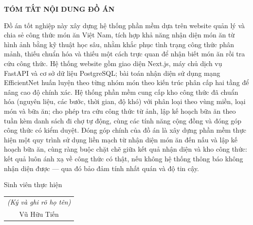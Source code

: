 \documentclass[../DoAn.tex]{subfiles}
\begin{document}
\begin{center}
    \Large{\textbf{TÓM TẮT NỘI DUNG ĐỒ ÁN}}\\
\end{center}
\vspace{1cm}
Đồ án tốt nghiệp này xây dựng hệ thống phần mềm dựa trên website quản lý và chia sẻ công thức món ăn Việt Nam, tích hợp khả năng nhận diện món ăn từ hình ảnh bằng kỹ thuật học sâu, nhằm khắc phục tình trạng công thức phân mảnh, thiếu chuẩn hóa và thiếu một cách trực quan để nhận biết món ăn rồi tra cứu công thức. Hệ thống website gồm giao diện Next.js, máy chủ dịch vụ FastAPI và cơ sở dữ liệu PostgreSQL; bài toán nhận diện sử dụng mạng EfficientNet huấn luyện theo từng nhóm món theo kiến trúc phân cấp hai tầng để nâng cao độ chính xác. Hệ thống phần mềm cung cấp kho công thức đã chuẩn hóa (nguyên liệu, các bước, thời gian, độ khó) với phân loại theo vùng miền, loại món và bữa ăn; cho phép tra cứu công thức từ ảnh, lập kế hoạch bữa ăn theo tuần kèm danh sách đi chợ tự động, cùng các tính năng cộng đồng và đóng góp công thức có kiểm duyệt. Đóng góp chính của đồ án là xây dựng phần mềm thực hiện một quy trình sử dụng liền mạch từ nhận diện món ăn đến nấu và lập kế hoạch bữa ăn, cùng ràng buộc chặt chẽ giữa kết quả nhận diện và kho công thức: kết quả luôn ánh xạ về công thức có thật, nếu không hệ thống thông báo không nhận diện được — qua đó bảo đảm tính nhất quán và độ tin cậy.
\begin{flushright}
Sinh viên thực hiện\\
\begin{tabular}{@{}c@{}}
\textit{(Ký và ghi rõ họ tên)}\\[1cm]
Vũ Hữu Tiến
\end{tabular}
\end{flushright}
\end{document}
